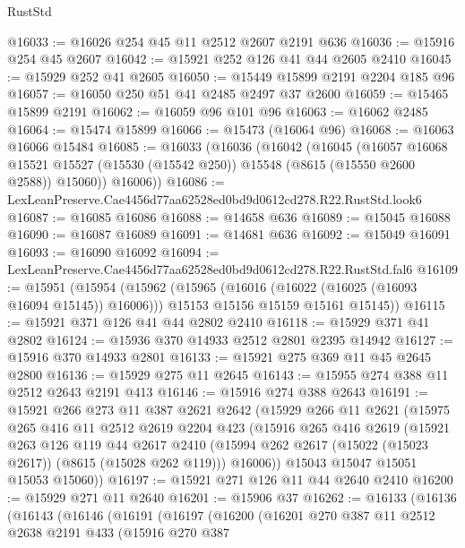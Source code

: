 \begin{lexlean}{RustStd}
\begin{coremodule}
@16033 := @16026 @254 @45 @11 @2512 @2607 @2191 @636
@16036 := @15916 @254 @45 @2607
@16042 := @15921 @252 @126 @41 @44 @2605 @2410
@16045 := @15929 @252 @41 @2605
@16050 := @15449 @15899 @2191 @2204 @185 @96
@16057 := @16050 @250 @51 @41 @2485 @2497 @37 @2600
@16059 := @15465 @15899 @2191
@16062 := @16059 @96 @101 @96
@16063 := @16062 @2485
@16064 := @15474 @15899
@16066 := @15473 (@16064 @96)
@16068 := @16063 @16066 @15484
@16085 := @16033
    (@16036
      (@16042
        (@16045
          (@16057
            @16068
            @15521
            @15527
            (@15530 (@15542 @250))
            @15548
            (@8615 (@15550 @2600 @2588))
            @15060))
        @16006))
@16086 := LexLeanPreserve.Cae4456d77aa62528ed0bd9d0612cd278.R22.RustStd.look6
@16087 := @16085 @16086
@16088 := @14658 @636
@16089 := @15045 @16088
@16090 := @16087 @16089
@16091 := @14681 @636
@16092 := @15049 @16091
@16093 := @16090 @16092
@16094 := LexLeanPreserve.Cae4456d77aa62528ed0bd9d0612cd278.R22.RustStd.fal6
@16109 := @15951
    (@15954
      (@15962
        (@15965 (@16016 (@16022 (@16025 (@16093 @16094 @15145)) @16006)))
        @15153
        @15156
        @15159
        @15161
        @15145))
@16115 := @15921 @371 @126 @41 @44 @2802 @2410
@16118 := @15929 @371 @41 @2802
@16124 := @15936 @370 @14933 @2512 @2801 @2395 @14942
@16127 := @15916 @370 @14933 @2801
@16133 := @15921 @275 @369 @11 @45 @2645 @2800
@16136 := @15929 @275 @11 @2645
@16143 := @15955 @274 @388 @11 @2512 @2643 @2191 @413
@16146 := @15916 @274 @388 @2643
@16191 := @15921
    @266
    @273
    @11
    @387
    @2621
    @2642
    (@15929
      @266
      @11
      @2621
      (@15975
        @265
        @416
        @11
        @2512
        @2619
        @2204
        @423
        (@15916
          @265
          @416
          @2619
          (@15921
            @263
            @126
            @119
            @44
            @2617
            @2410
            (@15994 @262 @2617 (@15022 (@15023 @2617)) (@8615 (@15028 @262 @119)))
            @16006))
        @15043
        @15047
        @15051
        @15053
        @15060))
@16197 := @15921 @271 @126 @11 @44 @2640 @2410
@16200 := @15929 @271 @11 @2640
@16201 := @15906 @37
@16262 := @16133
    (@16136
      (@16143
        (@16146
          (@16191
            (@16197
              (@16200
                (@16201
                  @270
                  @387
                  @11
                  @2512
                  @2638
                  @2191
                  @433
                  (@15916
                    @270
                    @387

\end{coremodule}
\end{lexlean}
